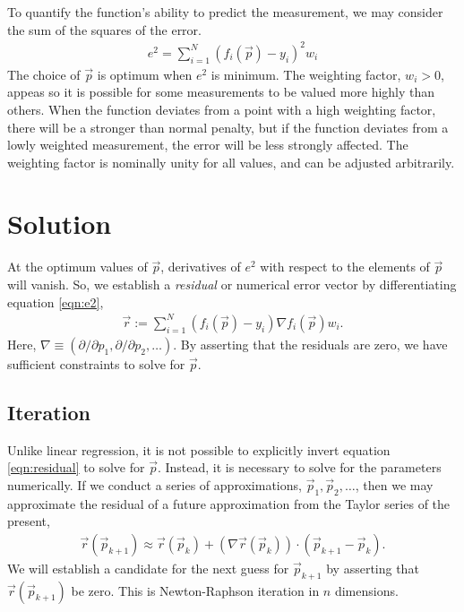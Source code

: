 \documentclass{article}
\def\p{\vec{p}}
\def\r{\vec{r}}
\begin{document}
To quantify the function's ability to predict the measurement, we may consider the sum of the squares of the error.
\begin{align}
e^2 = \sum_{i=1}^N (f_i(\p) - y_i)^2 w_i\label{eqn:e2}
\end{align}
The choice of $\p$ is optimum when $e^2$ is minimum.  The weighting factor, $w_i > 0$, appeas so it is possible for some measurements to be valued more highly than others.  When the function deviates from a point with a high weighting factor, there will be a stronger than normal penalty, but if the function deviates from a lowly weighted measurement, the error will be less strongly affected.  The weighting factor is nominally unity for all values, and can be adjusted arbitrarily.

\section{Solution}
At the optimum values of $\p$, derivatives of $e^2$ with respect to the elements of $\p$ will vanish.  So, we establish a \emph{residual} or numerical error vector by differentiating equation \ref{eqn:e2},
\begin{align}
\r := \sum_{i=1}^N (f_i(\p) - y_i) \nabla f_i(\p) w_i.\label{eqn:residual}
\end{align}
Here, $\nabla \equiv (\partial/\partial p_1, \partial/\partial p_2, \ldots )$.  By asserting that the residuals are zero, we have sufficient constraints to solve for $\p$.

\subsection{Iteration}
Unlike linear regression, it is not possible to explicitly invert equation \ref{eqn:residual} to solve for $\p$.  Instead, it is necessary to solve for the parameters numerically.  If we conduct a series of approximations, $\p_1, \p_2, \ldots$, then we may approximate the residual of a future approximation from the Taylor series of the present,
\begin{align}
\r(\p_{k+1}) \approx \r(\p_k) + (\nabla \r(\p_k))\cdot (\p_{k+1} - \p_k).\label{eqn:rstep}
\end{align}
We will establish a candidate for the next guess for $\p_{k+1}$ by asserting that $\r(\p_{k+1})$ be zero.  This is Newton-Raphson iteration in $n$ dimensions.
\end{document}
